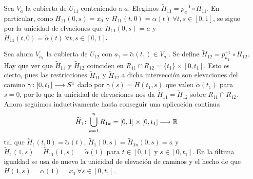 \documentclass[GTS.tex]{subfiles}
\begin{document}
\begin{dem}
\begin{enumerate}

Sea $V_a$ la cubierta de $U_{11}$ conteniendo a $a$. Elegimos $\widetilde{H}_{11}=p^{-1}_a\circ H_{11}$. En particular, como $H_{11}(0,s)=x_0$ y $H_{11}(t,0)=\alpha(t)\ \forall t,s\in[0,1]$, se sigue por la unicidad de elvaciones que $\widetilde{H}_{11}(0,s)=a$ y $\widetilde{H}_{11}(t,0)=\tilde{\alpha}(t)\ \forall t,s\in[0,1]$.

Sea ahora $V_{a_1}$ la cubierta de $U_{12}$ con $a_1=\tilde{\alpha}(t_1)\in V_{a_1}$. Se define $\widetilde{H}_{12}=p^{-1}_{a_1}\circ H_{12}$. Hay que ver que $\widetilde{H}_{11}$ y $\widetilde{H}_{12}$ coinciden en $R_{11}\cap R_{12}=\{t_1\}\times[0,t_1]$. Esto es cierto, pues las restricciones $\widetilde{H}_{11}$ y $\widetilde{H}_{12}$ a dicha intersección son elevaciones del camino $\gamma\colon{[0,t_1]}\longrightarrow{S^1}$ dado por $\gamma(s)=H(t_1,s)$ que valen $\tilde{\alpha}(t_1)$ para $s=0$, por lo que la unicidad de elevaciones nos da $\widetilde{H}_{11}=\widetilde{H}_{12}$ sobre $R_{11}\cap R_{12}$. Ahora seguimos inductivamente hasta conseguir una aplicación continua
\[
\widetilde{H}_1\colon{\bigcup_{k=1}^n R_{1k}=[0,1]\times[0,t_1]}\longrightarrow{\mathbb{R}}
\]
tal que $\widetilde{H}_1(t,0)=\tilde{\alpha}(t)$, $\widetilde{H}_1(0,s)=\widetilde{H}_{1n}(0,s)=a$ y  $\widetilde{H}_1(1,s)=\widetilde{H}_{11}(1,s)=\tilde{\alpha}(1)$ para $t\in [0,1]$ y $s\in[0,t_1]$. En la última igualdad se usa de nuevo la unicidad de elevación de caminos y el hecho de que $H(1,s)=\alpha(1)=x_1\ \forall s\in[0,t_1]$. 


\end{enumerate}
\end{dem}
\end{document}
